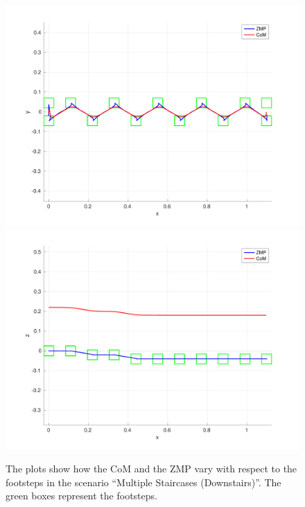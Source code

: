 \begin{figure}
  \centering
  \includegraphics[width=\textwidth]
      {figures/experiments/multiple-staircases/downstairs/xy-plot-2cm.pdf}
  \includegraphics[width=\textwidth]
      {figures/experiments/multiple-staircases/downstairs/xz-plot-2cm.pdf}
  \caption{The plots show how the CoM and the ZMP vary with respect to the
		footsteps in the scenario ``Multiple Staircases (Downstairs)''.
    The green boxes represent the footsteps.}
  \label{fig:experiments:multiple-staircases:downstairs:comzmp}
\end{figure}


